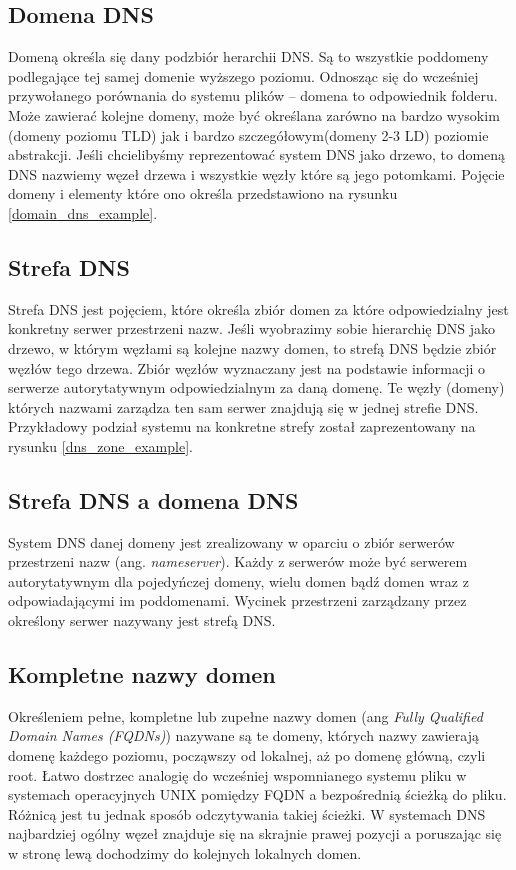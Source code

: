 \subsection{Domena DNS}
Domeną określa się dany podzbiór herarchii DNS. Są to wszystkie poddomeny podlegające tej samej domenie wyższego poziomu. Odnosząc się do wcześniej przywołanego porównania do systemu plików -- domena to odpowiednik folderu. Może zawierać kolejne domeny, może być określana zarówno na bardzo wysokim (domeny poziomu TLD) jak i bardzo szczegółowym(domeny 2-3 LD) poziomie abstrakcji. Jeśli chcielibyśmy reprezentować system DNS jako drzewo, to domeną DNS nazwiemy węzeł drzewa i wszystkie węzły które są jego potomkami. Pojęcie domeny i elementy które ono określa przedstawiono na rysunku \ref{domain_dns_example}.

\subsection{Strefa DNS}
Strefa DNS jest pojęciem, które określa zbiór domen za które odpowiedzialny jest konkretny serwer przestrzeni nazw. Jeśli wyobrazimy sobie hierarchię DNS jako drzewo, w którym węzłami są kolejne nazwy domen, to strefą DNS będzie zbiór węzłów tego drzewa. Zbiór węzłów wyznaczany jest na podstawie informacji o serwerze autorytatywnym odpowiedzialnym za daną domenę. Te węzły (domeny) których nazwami zarządza ten sam serwer znajdują się w jednej strefie DNS. Przykładowy podział systemu na konkretne strefy został zaprezentowany na rysunku \ref{dns_zone_example}.

\subsection{Strefa DNS a domena DNS}
System DNS danej domeny jest zrealizowany w oparciu o zbiór serwerów przestrzeni nazw (ang. \textit{nameserver}). Każdy z serwerów może być serwerem autorytatywnym dla pojedyńczej domeny, wielu domen bądź domen wraz z odpowiadającymi im poddomenami. Wycinek przestrzeni zarządzany przez określony serwer nazywany jest strefą DNS. 


\subsection{Kompletne nazwy domen}
Określeniem pełne, kompletne lub zupełne nazwy domen (ang \textit{Fully Qualified Domain Names (FQDNs)}) nazywane są te domeny, których nazwy zawierają domenę każdego poziomu, począwszy od lokalnej, aż po domenę główną, czyli root. Łatwo dostrzec analogię do wcześniej wspomnianego systemu pliku w systemach operacyjnych UNIX pomiędzy FQDN a bezpośrednią ścieżką do pliku. Różnicą jest tu jednak sposób odczytywania takiej ścieżki. W systemach DNS najbardziej ogólny węzeł znajduje się na skrajnie prawej pozycji a poruszając się w stronę lewą dochodzimy do kolejnych lokalnych domen. 

